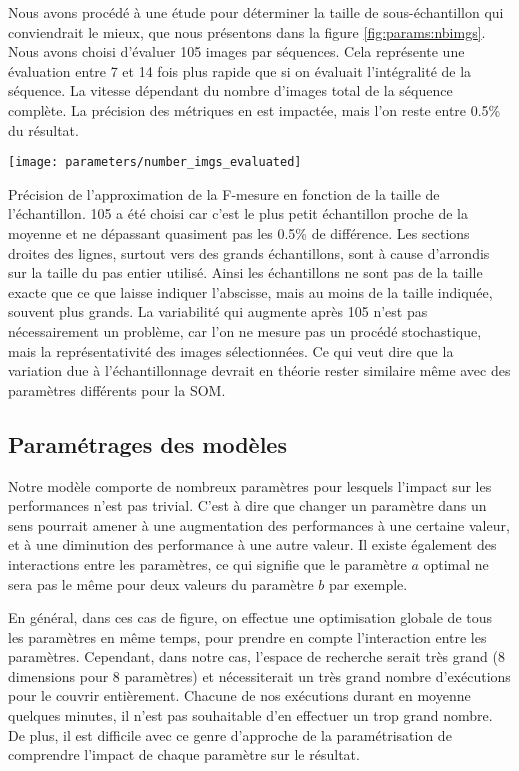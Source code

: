 	Nous avons procédé à une étude pour déterminer la taille de sous-échantillon qui conviendrait le mieux, que nous présentons dans la figure \ref{fig:params:nbimgs}. Nous avons choisi d'évaluer 105 images par séquences. Cela représente une évaluation entre 7 et 14 fois plus rapide que si on évaluait l'intégralité de la séquence. La vitesse dépendant du nombre d'images total de la séquence complète. La précision des métriques en est impactée, mais l'on reste entre 0.5\% du résultat.

	\begin{figureth}
		\texttt{[image: parameters/number\_imgs\_evaluated]}
		\caption[Échantillonnage de l'évaluation]{Précision de l'approximation de la F-mesure en fonction de la taille de l'échantillon. 105 a été choisi car c'est le plus petit échantillon proche de la moyenne et ne dépassant quasiment pas les 0.5\% de différence. Les sections droites des lignes, surtout vers des grands échantillons, sont à cause d'arrondis sur la taille du pas entier utilisé. Ainsi les échantillons ne sont pas de la taille exacte que ce que laisse indiquer l'abscisse, mais au moins de la taille indiquée, souvent plus grands. La variabilité qui augmente après 105 n'est pas nécessairement un problème, car l'on ne mesure pas un procédé stochastique, mais la représentativité des images sélectionnées. Ce qui veut dire que la variation due à l'échantillonnage devrait en théorie rester similaire même avec des paramètres différents pour la SOM.}\label{fig:params:nbimgs}
	\end{figureth}

	\subsection{Paramétrages des modèles}

	Notre modèle comporte de nombreux paramètres pour lesquels l'impact sur les performances n'est pas trivial. C'est à dire que changer un paramètre dans un sens pourrait amener à une augmentation des performances à une certaine valeur, et à une diminution des performance à une autre valeur. Il existe également des interactions entre les paramètres, ce qui signifie que le paramètre $a$ optimal ne sera pas le même pour deux valeurs du paramètre $b$ par exemple. 

	En général, dans ces cas de figure, on effectue une optimisation globale de tous les paramètres en même temps, pour prendre en compte l'interaction entre les paramètres. Cependant, dans notre cas, l'espace de recherche serait très grand (8 dimensions pour 8 paramètres) et nécessiterait un très grand nombre d'exécutions pour le couvrir entièrement. Chacune de nos exécutions durant en moyenne quelques minutes, il n'est pas souhaitable d'en effectuer un trop grand nombre. De plus, il est difficile avec ce genre d'approche de la paramétrisation de comprendre l'impact de chaque paramètre sur le résultat.

